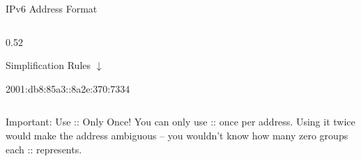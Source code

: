 \documentclass[aspectratio=169]{beamer}  %
\begin{document}
\begin{frame}{IPv6 Address Format}
\begin{columns}[T]
\begin{column}{0.52\textwidth}
\begin{block}{Simplification Rules}
                \vspace{0.1em}
                $\downarrow$
                
                \vspace{0.1em}
                2001:db8:85a3\textcolor{networkgreen}{::}8a2e:370:7334
            \end{block}
        \end{column}
    \end{columns}
    
    \vspace{0.3em}
    \begin{alertblock}{Important: Use :: Only Once!}
        You can only use :: once per address. Using it twice would make the address ambiguous -- you wouldn't know how many zero groups each :: represents.
    \end{alertblock}
\end{frame}
\end{document}
